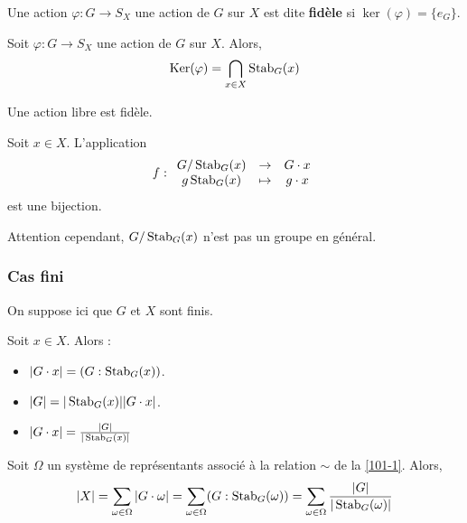 
  \begin{definition}
    Une action  $\varphi : G \rightarrow S_X$ une action de $G$ sur $X$ est dite \textbf{fidèle} si $\ker(\varphi) = \{ e_G \}$.
  \end{definition}

  \begin{proposition}
    Soit $\varphi : G \rightarrow S_X$ une action de $G$ sur $X$. Alors,
    \[ \mathrm{Ker}(\varphi) = \bigcap_{x \in X} \operatorname{Stab}_G(x) \]
  \end{proposition}

  \begin{corollary}
    Une action libre est fidèle.
  \end{corollary}


  \begin{proposition}
    Soit $x \in X$. L'application
    \[ f :
    \begin{array}{ccc}
       G/\operatorname{Stab}_G(x) &\rightarrow& G \cdot x \\
       g \operatorname{Stab}_G(x) &\mapsto& g \cdot x
    \end{array}
    \]
    est une bijection.
  \end{proposition}

  \begin{remark}
    Attention cependant, $G/\operatorname{Stab}_G(x)$ n'est pas un groupe en général.
  \end{remark}

  \subsubsection{Cas fini}

  On suppose ici que $G$ et $X$ sont finis.

  \begin{proposition}
    Soit $x \in X$. Alors :
    \begin{itemize}
      \item $|G \cdot x| = (G : \operatorname{Stab}_G(x))$.
      \item $|G| = |\operatorname{Stab}_G(x)| |G \cdot x|$.
      \item $|G \cdot x| = \frac{|G|}{|\operatorname{Stab}_G(x)|}$
    \end{itemize}
  \end{proposition}

  \begin{theorem}
    Soit $\Omega$ un système de représentants associé à la relation $\sim$ de la \cref{101-1}. Alors,
    \[ |X| = \sum_{\omega \in \Omega} |G \cdot \omega| = \sum_{\omega \in \Omega} (G : \operatorname{Stab}_G(\omega)) = \sum_{\omega \in \Omega} \frac{|G|}{|\operatorname{Stab}_G(\omega)|} \]
  \end{theorem}

